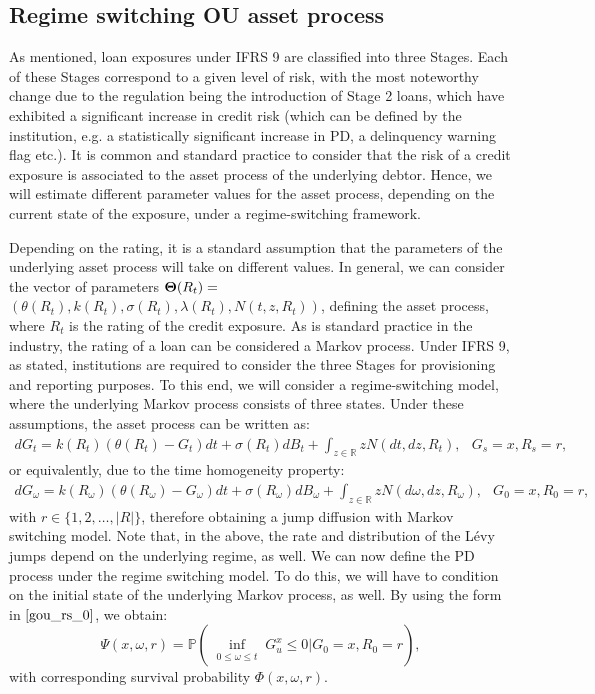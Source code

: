 \documentclass[11pt,reqno]{article}
\theoremstyle{definition}
\begin{document}
\subsection{Regime switching OU asset process}
As mentioned, loan exposures under IFRS 9 are classified into three Stages. Each of these Stages correspond to a given level of risk, with the most noteworthy change due to the regulation being the introduction of Stage 2 loans, which have exhibited a significant increase in credit risk (which can be defined by the institution, e.g. a statistically significant increase in PD, a delinquency warning flag etc.). It is common and standard practice to consider that the risk of a credit exposure is associated to the asset process of the underlying debtor. Hence, we will estimate different parameter values for the asset process, depending on the current state of the exposure, under a regime-switching framework. 
 
 \par Depending on the rating, it is a standard assumption that the parameters of the underlying asset process will take on different values. In general, we can consider the vector of parameters ${\bf \Theta}(R_t)=$ $(\theta(R_t), k(R_t), \sigma(R_t), \lambda(R_t), N(t,z,R_t) )$, defining the asset process, where $R_t$ is the rating of the credit exposure. As is standard practice in the industry, the rating of a loan can be considered a Markov process. Under IFRS 9, as stated, institutions are required to consider the three Stages for provisioning and reporting purposes. To this end, we will consider a regime-switching model, where the underlying Markov process consists of three states. Under these assumptions, the asset process can be written as:
\begin{eqnarray}\label{gou_rs}
dG_t=k(R_t)(\theta(R_t) - G_t)dt + \sigma(R_t) dB_t +  \int_{z\in \mathbb{R}} z N(dt,dz,R_t), \,\,\,\ G_s =x, R_s = r,
\end{eqnarray}
or equivalently, due to the time homogeneity property: 
\begin{eqnarray}\label{gou_rs_0}
	dG_\omega=k(R_\omega)(\theta(R_\omega) - G_\omega)dt + \sigma(R_\omega) dB_\omega +  \int_{z\in \mathbb{R}} z N(d\omega,dz,R_\omega), \,\,\,\ G_0 =x, R_0 = r,
\end{eqnarray}
with $r \in \{1,2,\dots, |R|\}$, therefore obtaining a jump diffusion with Markov switching model. Note that, in the above, the rate and distribution of the L\'evy jumps depend on the underlying regime, as well. We can now define the PD process under the regime switching model. To do this, we will have to condition on the initial state of the underlying Markov process, as well. By using the form in $\ref{gou_rs_0}$, we obtain: 
$$ \Psi(x,\omega,r)= \mathbb{P}(\inf_{\substack{0 \leq \omega \leq t}} G_u^x \leq 0| G_0=x, R_0 = r), $$ with corresponding survival probability $\Phi(x,\omega,r)$.
\end{document}
